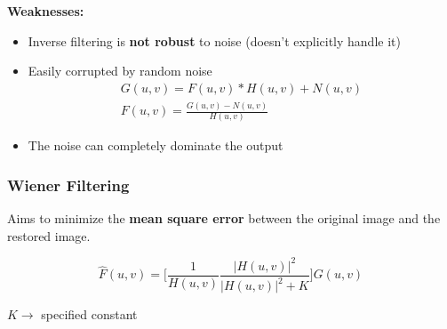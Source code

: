 \textbf{Weaknesses:}

\begin{itemize}
  \item Inverse filtering is \textbf{not robust} to noise (doesn't
    explicitly handle it)
  \item Easily corrupted by random noise
    \begin{gather*}
      G(u, v) = F(u, v) * H(u, v) + N(u, v) \\
      F(u, v) = \frac{G(u, v) - N(u, v)}{H(u, v)}
    \end{gather*}
  \item The noise can completely dominate the output
\end{itemize}

\subsubsection*{Wiener Filtering}

Aims to minimize the \textbf{mean square error} between the original
image and the restored image.

\begin{equation*}
  \hat{F}(u, v) = \bigg[ \frac{1}{H(u, v)} \frac{|H(u, v)|^2}{|H(u, v)|^2 + K} \bigg] G(u, v)
\end{equation*}

$K \rightarrow$ specified constant
